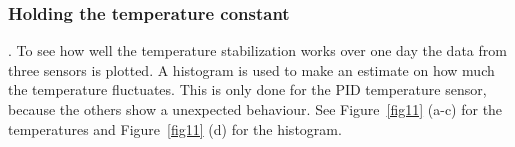 \documentclass[12pt]{scrartcl}
\begin{document}
      \subsubsection{Holding the temperature constant}.
      To see how well the temperature stabilization works over one day the data
      from three sensors is plotted. A histogram is used to make an estimate on
      how much the temperature fluctuates. This is only done for the PID temperature
      sensor, because the others show a unexpected behaviour.
      See Figure~\ref{fig11} (a-c) for the temperatures and Figure~\ref{fig11} (d)
      for the histogram.
        \begin{figure}[h!]
          \hspace{-40pt}
          \hspace{-20pt}

\end{figure}
\end{document}
